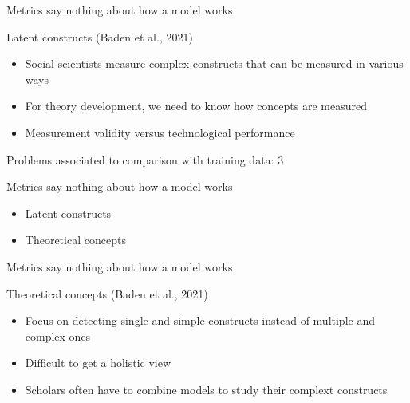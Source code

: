 \documentclass[compress]{beamer}
\begin{document}
\begin{frame}[fragile]{Metrics say nothing about how a model works} 	
	\begin{alertblock}{Latent constructs (Baden et al., 2021)}
		\begin{itemize}
			\item Social scientists measure complex constructs that can be measured in various ways
			\item For theory development, we need to know how concepts are measured
			\item Measurement validity versus technological performance
		\end{itemize}
	\end{alertblock}
\end{frame}


\begin{frame}[fragile]{Problems associated to comparison with training data: 3} 	
	\begin{alertblock}{Metrics say nothing about how a model works}
		\begin{itemize}
			\item Latent constructs
			\item Theoretical concepts
		\end{itemize}
	\end{alertblock}
\end{frame}

\begin{frame}[fragile]{Metrics say nothing about how a model works} 	
	\begin{alertblock}{Theoretical concepts (Baden et al., 2021)}
		\begin{itemize}
			\item Focus on detecting single and simple constructs instead of multiple and complex ones
			\item Difficult to get a holistic view
			\item Scholars often have to combine models to study their complext constructs
		\end{itemize}
	\end{alertblock}
\end{frame}
\end{document}
